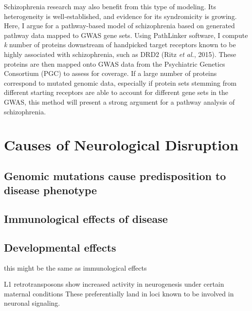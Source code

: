 \documentclass[12pt,twoside]{reedthesis}
\begin{document}
Schizophrenia research may also benefit from this type of modeling. Its heterogeneity is well-established, and evidence for its syndromicity is growing. Here, I argue for a pathway-based model of schizophrenia based on generated pathway data mapped to GWAS gene sets. Using PathLinker software, I compute \textit{k} number of proteins downstream of handpicked target receptors known to be highly associated with schizophrenia, such as DRD2 (Ritz \textit{et al.}, 2015). These proteins are then mapped onto GWAS data from the Psychiatric Genetics Consortium (PGC) to assess for coverage. If a large number of proteins correspond to mutated genomic data, especially if protein sets stemming from different starting receptors are able to account for different gene sets in the GWAS, this method will present a strong argument for a pathway analysis of schizophrenia.
	
%	
	
\chapter{Causes of Neurological Disruption}
    	\section{Genomic mutations cause predisposition to disease phenotype}
	\section{Immunological effects of disease}
	\section{Developmental effects}
		\begin{description}
		\item this might be the same as immunological effects
		\item L1 retrotransposons show increased activity in neurogenesis under certain maternal conditions
				  These preferentially land in loci known to be involved in neuronal signaling. 
		\end{description}
\end{document}
